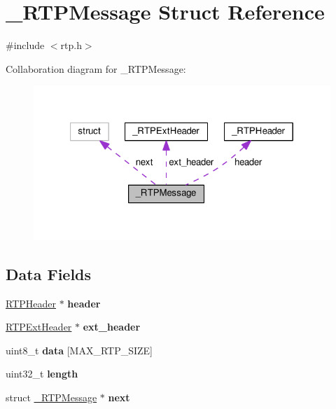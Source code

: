 \hypertarget{struct___r_t_p_message}{\section{\+\_\+\+R\+T\+P\+Message Struct Reference}
\label{struct___r_t_p_message}
}


{\ttfamily \#include $<$rtp.\+h$>$}



Collaboration diagram for \+\_\+\+R\+T\+P\+Message\+:
\nopagebreak
\begin{figure}[H]
\begin{center}
\leavevmode
\includegraphics[width=321pt]{struct___r_t_p_message__coll__graph}
\end{center}
\end{figure}
\subsection*{Data Fields}
\begin{DoxyCompactItemize}
\item 
\hypertarget{struct___r_t_p_message_afa0aee0d9eab5781c753943ec6a37584}{\hyperlink{struct___r_t_p_header}{R\+T\+P\+Header} $\ast$ {\bfseries header}}\label{struct___r_t_p_message_afa0aee0d9eab5781c753943ec6a37584}

\item 
\hypertarget{struct___r_t_p_message_aa0a69d899b1bee283ae1490f53bcd073}{\hyperlink{struct___r_t_p_ext_header}{R\+T\+P\+Ext\+Header} $\ast$ {\bfseries ext\+\_\+header}}\label{struct___r_t_p_message_aa0a69d899b1bee283ae1490f53bcd073}

\item 
\hypertarget{struct___r_t_p_message_a89f8083b50c7cef74e96797bb74f8757}{uint8\+\_\+t {\bfseries data} \mbox{[}M\+A\+X\+\_\+\+R\+T\+P\+\_\+\+S\+I\+Z\+E\mbox{]}}\label{struct___r_t_p_message_a89f8083b50c7cef74e96797bb74f8757}

\item 
\hypertarget{struct___r_t_p_message_aebb70c2aab3407a9f05334c47131a43b}{uint32\+\_\+t {\bfseries length}}\label{struct___r_t_p_message_aebb70c2aab3407a9f05334c47131a43b}

\item 
\hypertarget{struct___r_t_p_message_af02d4bf6724c59e5df90bacdfc8a8499}{struct \hyperlink{struct___r_t_p_message}{\+\_\+\+R\+T\+P\+Message} $\ast$ {\bfseries next}}\label{struct___r_t_p_message_af02d4bf6724c59e5df90bacdfc8a8499}

\end{DoxyCompactItemize}


